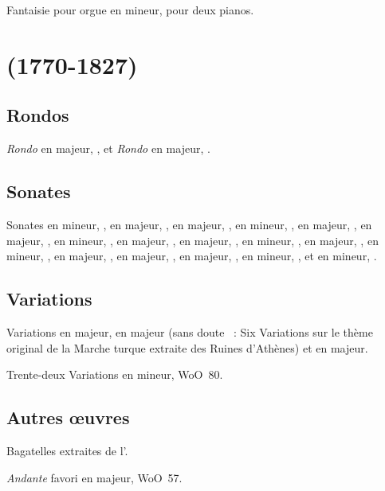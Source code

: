 Fantaisie pour orgue en \kF mineur, pour deux pianos.

\section[%
Ludwig van Beethoven (1770-1827)]{%
\LBeethoven{} (1770-1827)}

\subsection{Rondos}

\emph{Rondo} en \kC majeur,  , et \emph{Rondo} en \kG
majeur,  .

\subsection{Sonates}

Sonates  en \kF mineur,  ,  en \kA
majeur,  ,  en \kC majeur,  ,
 en \kC mineur,  ,  en \kF majeur,
 ,  en \kD majeur,  ,
 en \kC mineur, ,  en \kE majeur, 
,  en \kA \Flat majeur, ,  en \kC
\Sharp mineur,  ,  en \kD majeur, ,
 en \kF mineur, ,  en \kF \Sharp majeur,
,  en \kG majeur, ,  en \kE \Flat
majeur, ,  en \kE mineur, , et  en
\kC mineur, .

\subsection{Variations}

Variations en \kG majeur, en \kD majeur (sans doute ~: Six
Variations sur le thème original de la Marche turque extraite des Ruines
d'\hbox{Athènes}) et en \kA majeur.

Trente-deux Variations en \kC mineur, WoO~80.

\subsection{Autres œuvres}

Bagatelles extraites de l'.

\emph{Andante} favori en \kF majeur, WoO~57.

